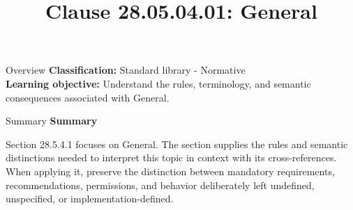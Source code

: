 \documentclass[10pt,letterpaper]{article}
\title{Clause 28.05.04.01: General}
\author{}
\date{}
\begin{document}
\maketitle
\begin{CornellOverviewBox}{Overview}
\textbf{Classification:} Standard library - Normative\\[2pt]
\textbf{Learning objective:} Understand the rules, terminology, and semantic consequences associated with General.
\end{CornellOverviewBox}\begin{CornellSummaryBox}{Summary}
{\sffamily\bfseries\color{Accent} Summary}\par\vspace{3pt}Section 28.5.4.1 focuses on General. The section supplies the rules and semantic distinctions needed to interpret this topic in context with its cross-references. When applying it, preserve the distinction between mandatory requirements, recommendations, permissions, and behavior deliberately left undefined, unspecified, or implementation-defined.
\end{CornellSummaryBox}
\end{document}
